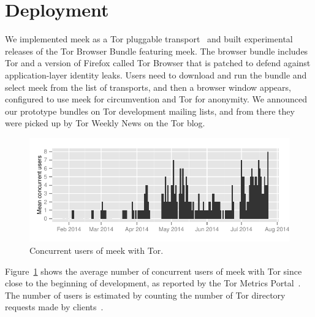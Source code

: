 \documentclass[conference]{IEEEtran}
\begin{document}




\section{Deployment}
\label{sec:deployment}

We implemented meek as a Tor pluggable transport~\cite{pt}
and built experimental releases of the Tor Browser Bundle featuring meek.
The browser bundle includes Tor and a version of Firefox
called Tor Browser that is patched to defend against application-layer identity leaks.
Users need to download and run the bundle and select meek from the list of transports,
and then a browser window appears,
configured to use meek for circumvention and Tor for anonymity.
We announced our prototype bundles on Tor development mailing lists,
and from there they were picked up by Tor Weekly News on the Tor blog.

\begin{figure}
\includegraphics[width=\linewidth]{clients-meek}
\caption{Concurrent users of meek with Tor.}
\label{fig:clients}
\end{figure}

Figure~\ref{fig:clients} shows the average number of concurrent users of meek with Tor
since close to the beginning of development,
as reported by the Tor Metrics Portal~\cite{metrics-meek}.
The number of users is estimated by counting the number
of Tor directory requests made by clients~\cite{counting-daily-bridge-users}.
\end{document}
